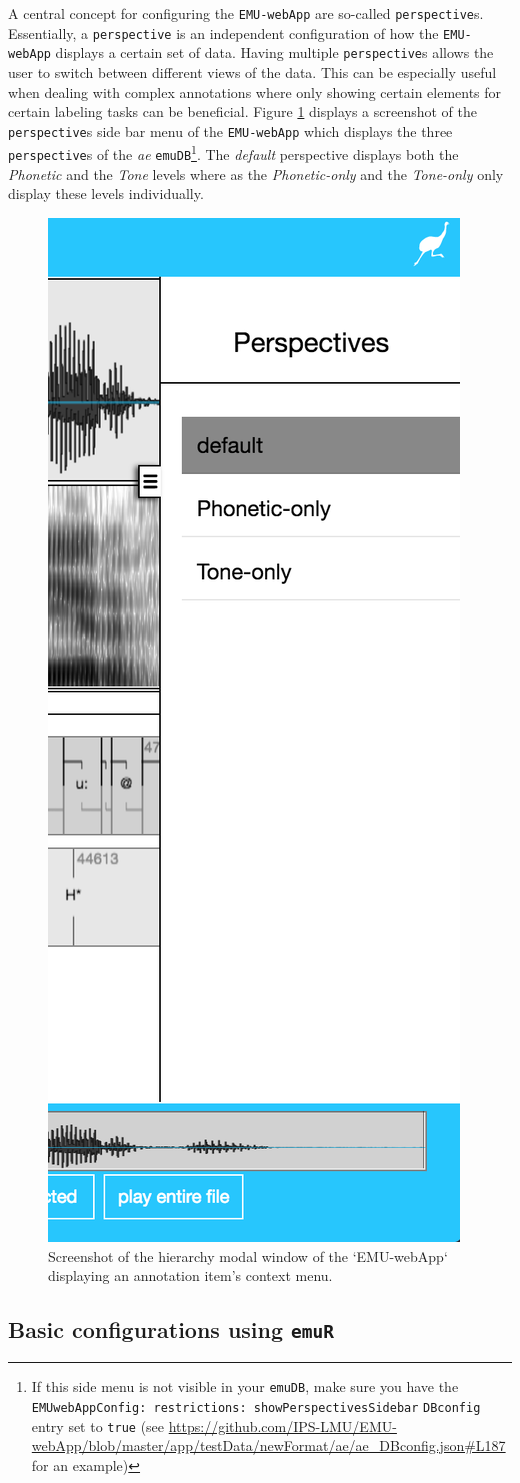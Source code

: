 \documentclass[]{book}
\let\rmarkdownfootnote\footnote%
\def\footnote{\protect\rmarkdownfootnote}
\theoremstyle{definition}
\theoremstyle{definition}
\theoremstyle{definition}
\theoremstyle{remark}
\begin{document}
A central concept for configuring the \texttt{EMU-webApp} are so-called
\texttt{perspective}s. Essentially, a \texttt{perspective} is an
independent configuration of how the \texttt{EMU-webApp} displays a
certain set of data. Having multiple \texttt{perspective}s allows the
user to switch between different views of the data. This can be
especially useful when dealing with complex annotations where only
showing certain elements for certain labeling tasks can be beneficial.
Figure \ref{fig:webApp-perspMenu} displays a screenshot of the
\texttt{perspective}s side bar menu of the \texttt{EMU-webApp} which
displays the three \texttt{perspective}s of the \emph{ae}
\texttt{emuDB}\footnote{If this side menu is not visible in your
  \texttt{emuDB}, make sure you have the
  \texttt{EMUwebAppConfig:\ restrictions:\ showPerspectivesSidebar}
  \texttt{DBconfig} entry set to \texttt{true} (see
  \url{https://github.com/IPS-LMU/EMU-webApp/blob/master/app/testData/newFormat/ae/ae_DBconfig.json\#L187}
  for an example)}. The \emph{default} perspective displays both the
\emph{Phonetic} and the \emph{Tone} levels where as the
\emph{Phonetic-only} and the \emph{Tone-only} only display these levels
individually.

\begin{figure}

{\centering \includegraphics[width=0.25\linewidth]{pics/emu-webAppPerspMenu} 

}

\caption{Screenshot of the hierarchy modal window of the `EMU-webApp` displaying an annotation item's context menu.}\label{fig:webApp-perspMenu}
\end{figure}

\hypertarget{subsec:emu-webAppConfigWithEmuR}{%
\subsection{\texorpdfstring{Basic configurations using
\texttt{emuR}}{Basic configurations using emuR}}\label{subsec:emu-webAppConfigWithEmuR}}
\end{document}
